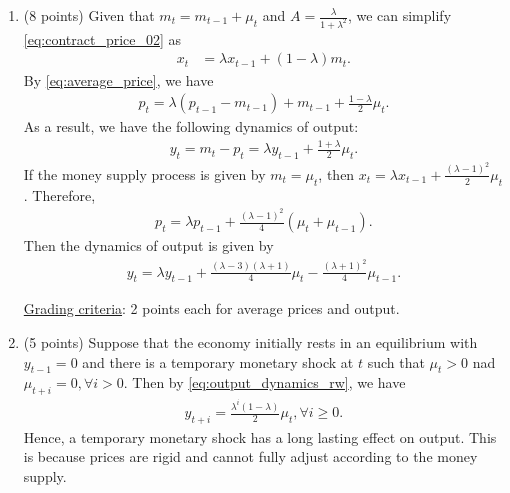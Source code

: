 \documentclass[12pt]{article}
\begin{document}
\begin{enumerate}
    Note that the discriminante is $1-4A^2$. Since $A\leq\frac{1}{2}$, we have $1-4A^2 \geq 0$ with equality holding if and only if $\phi = 0$. Therefore, this quadratic equation has two distinct roots, $\lambda_1 = \frac{1-\sqrt{1-4A^2}}{2A} \in (-1,1)$ and $\lambda_2 = \frac{1+\sqrt{1-4A^2}}{2A} > 1$. The ensure stability, we choose the stable root $\lambda = \lambda_1$.

    \underline{Grading criteria}: 4 points for \eqref{eq:contract_price_02}. 2 points for checking discriminant. 2 points for root choice.
    
    \item (8 points) Given that $m_t = m_{t-1} + \mu_t$ and $A = \frac{\lambda}{1+\lambda^2}$, we can simplify \eqref{eq:contract_price_02} as
    \begin{align*}
        x_t &= \lambda x_{t-1} + (1-\lambda) m_t.
    \end{align*}
    By \eqref{eq:average_price}, we have
    \begin{align}\label{eq:average_price_rw}
        p_t = \lambda (p_{t-1} - m_{t-1}) + m_{t-1} + \frac{1-\lambda}{2} \mu_t.
    \end{align}
    As a result, we have the following dynamics of output:
    \begin{align}\label{eq:output_dynamics_rw}
        y_t = m_t - p_t = \lambda y_{t-1} + \frac{1+\lambda}{2} \mu_t.
    \end{align}
    If the money supply process is given by $m_t = \mu_t$, then $x_t = \lambda x_{t-1} + \frac{(\lambda-1)^2}{2}\mu_t$. Therefore,
    \begin{align*}
        p_t = \lambda p_{t-1} + \frac{(\lambda-1)^2}{4}(\mu_t + \mu_{t-1}).
    \end{align*}
    Then the dynamics of output is given by
    \begin{align*}
        y_t = \lambda y_{t-1} + \frac{(\lambda-3)(\lambda+1)}{4}\mu_t - \frac{(\lambda+1)^2}{4}\mu_{t-1}.
    \end{align*}

    \underline{Grading criteria}: 2 points each for average prices and output.

    \item (5 points) Suppose that the economy initially rests in an equilibrium with $y_{t-1} = 0$ and there is a temporary monetary shock at $t$ such that $\mu_t > 0$ nad $\mu_{t+i} = 0, \forall i > 0$. Then by \eqref{eq:output_dynamics_rw}, we have
    \begin{align*}
        y_{t+i} = \frac{\lambda^i (1-\lambda)}{2}\mu_t, \forall i\geq 0.
    \end{align*}
    Hence, a temporary monetary shock has a long lasting effect on output. This is because prices are rigid and cannot fully adjust according to the money supply. 


\end{enumerate}
\end{document}
